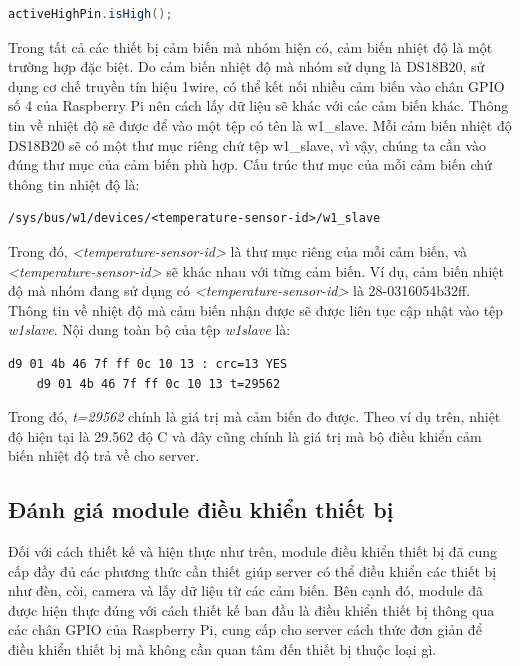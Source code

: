 \documentclass[12pt,a4paper,oneside]{extbook}
\begin{document}
\begin{lstlisting}[language=Java, label={lst:check-state-active-high}]
	activeHighPin.isHigh();
\end{lstlisting}

\noindent
Trong tất cả các thiết bị cảm biến mà nhóm hiện có, cảm biến nhiệt độ là một trường hợp đặc biệt. Do cảm biến nhiệt độ mà nhóm sử dụng là DS18B20, sử dụng cơ chế truyền tín hiệu 1\-wire, có thể kết nối nhiều cảm biến vào chân GPIO số 4 của Raspberry Pi nên cách lấy dữ liệu sẽ khác với các cảm biến khác. Thông tin về nhiệt độ sẽ được để vào một tệp có tên là w1\_slave. Mỗi cảm biến nhiệt độ DS18B20 sẽ có một thư mục riêng chứ tệp w1\_slave, vì vậy, chúng ta cần vào đúng thư mục của cảm biến phù hợp. Cấu trúc thư mục của mỗi cảm biến chứ thông tin nhiệt độ là:
\begin{verbatim}
/sys/bus/w1/devices/<temperature-sensor-id>/w1_slave
\end{verbatim}
Trong đó, \textit{<temperature-sensor-id>} là thư mục riêng của mỗi cảm biến, và \textit{<temperature-sensor-id>} sẽ khác nhau với từng cảm biến. Ví dụ, cảm biến nhiệt độ mà nhóm đang sử dụng có \textit{<temperature-sensor-id>} là 28-0316054b32ff. Thông tin về nhiệt độ mà cảm biến nhận được sẽ được liên tục cập nhật vào tệp \textit{w1\textunderscore slave}. Nội dung toàn bộ của tệp \textit{w1\textunderscore slave} là:

\begin{lstlisting}[label={lst:temperature-file}]
	d9 01 4b 46 7f ff 0c 10 13 : crc=13 YES
	d9 01 4b 46 7f ff 0c 10 13 t=29562
\end{lstlisting}

\noindent
Trong đó, \textit{t=29562} chính là giá trị mà cảm biến đo được. Theo ví dụ trên, nhiệt độ hiện tại là 29.562 độ C và đây cũng chính là giá trị mà bộ điều khiển cảm biến nhiệt độ trả về cho server.\\

\subsection{Đánh giá module điều khiển thiết bị}
Đối với cách thiết kế và hiện thực như trên, module điều khiển thiết bị đã cung cấp đầy đủ các phương thức cần thiết giúp server có thể điều khiển các thiết bị như đèn, còi, camera và lấy dữ liệu từ các cảm biến. Bên cạnh đó, module đã được hiện thực đúng với cách thiết kế ban đầu là điều khiển thiết bị thông qua các chân GPIO của Raspberry Pi, cung cấp cho server cách thức đơn giản để điều khiển thiết bị mà không cần quan tâm đến thiết bị thuộc loại gì.\\
\end{document}

